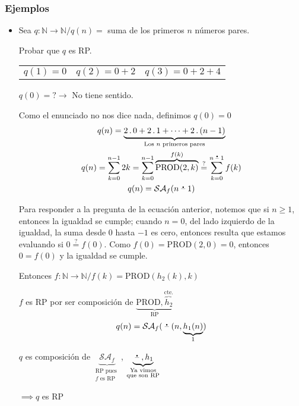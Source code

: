 \subsubsection{Ejemplos}
\begin{itemize}
    \item Sea $q: \mathbb{N} \to \mathbb{N} / q(n) =$ suma de los primeros $n$
        números pares.

    Probar que $q$ es RP.
    
    \medskip
    
    \begin{center}
        \begin{tabular}{c c c}
            $q(1)=0$ & $q(2)=0 + 2$ & $q(3)=0 + 2 + 4$ \\
        \end{tabular}
    
        $q(0) = ? \rightarrow$ No tiene sentido.
    \end{center}
    Como el enunciado no nos dice nada, definimos $q(0)=0$
    \begin{gather*}
        q(n) = \underbrace{2 \, . \, 0 + 2 \, . \, 1 + \dots + 2 \, . \, 
        (n-1)}_{%
        \text{Los } n \text{ primeros pares}} \\
        q(n) = \sum_{k=0}^{n-1} 2 k 
        = \sum_{k=0}^{n-1} \overbrace{\mathrm{PROD}(2,k)}^{f(k)} 
        \stackrel{?}{=} \sum_{k=0}^{n \restatruncada 1} f(k) \\
        q(n) = \mathcal{SA}_f (n \restatruncada 1)
    \end{gather*}
    
    Para responder a la pregunta de la ecuación anterior, notemos que si 
    $n \geq 1$, entonces la igualdad se cumple; cuando $n = 0$, del lado
    izquierdo de la igualdad, la suma desde 0 hasta $-1$ es cero, entonces
    resulta que estamos evaluando si $0 \stackrel{?}{=} f(0)$.
    Como  $f(0) = \mathrm{PROD}(2,0) = 0$, entonces $0 = f(0)$ y la igualdad
    se cumple.
    
    Entonces $f: \mathbb{N} \to \mathbb{N} / f(k) = \mathrm{PROD}(h_2(k), k)$
    
    $f$ es RP por ser composición de 
    $\underbrace{\mathrm{PROD}, \overbrace{h_2}^{\text{cte.}}}_{\text{RP}}$
    \begin{gather*}
        q(n) = \mathcal{SA}_f (\;\accentset{\mbox{\large\bfseries .}}{\text{--}}\; (n, \underbrace{h_1(n)}_{1})
    \end{gather*}
    
    $q$ es composición de $\underbrace{\mathcal{SA}_f}_{\substack{%
    \text{RP pues }\\ f \text{ es RP}}}$,
    $\underbrace{\restatruncada, h_1}_{\substack{\text{Ya vimos}\\%
    \text{que son RP}}}$
    \begin{center}
        $\implies q$ es RP
    \end{center}
    

\end{itemize}
